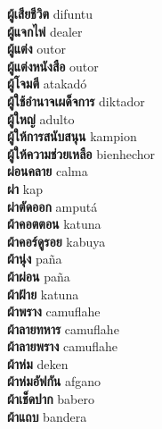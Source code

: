 \textbf{ ผู้เสียชีวิต  } difuntu \\
\textbf{ ผู้แจกไพ่  } dealer \\
\textbf{ ผู้แต่ง  } outor \\
\textbf{ ผู้แต่งหนังสือ  } outor \\
\textbf{ ผู้โจมตี  } atakadó \\
\textbf{ ผู้ใช้อำนาจเผด็จการ  } diktador \\
\textbf{ ผู้ใหญ่  } adulto \\
\textbf{ ผู้ให้การสนับสนุน  } kampion \\
\textbf{ ผู้ให้ความช่วยเหลือ  } bienhechor \\
\textbf{ ผ่อนคลาย  } calma \\
\textbf{ ผ่า  } kap \\
\textbf{ ผ่าตัดออก  } amputá \\
\textbf{ ผ้าคอตตอน  } katuna \\
\textbf{ ผ้าคอร์ดูรอย  } kabuya \\
\textbf{ ผ้านุ่ง  } paña \\
\textbf{ ผ้าผ่อน  } paña \\
\textbf{ ผ้าฝ้าย  } katuna \\
\textbf{ ผ้าพราง  } camuflahe \\
\textbf{ ผ้าลายทหาร  } camuflahe \\
\textbf{ ผ้าลายพราง  } camuflahe \\
\textbf{ ผ้าห่ม  } deken \\
\textbf{ ผ้าห่มอัฟกัน  } afgano \\
\textbf{ ผ้าเช็ดปาก  } babero \\
\textbf{ ผ้าแถบ  } bandera \\
